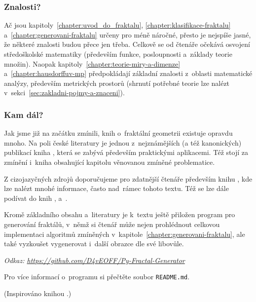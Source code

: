 \subsubsection{Znalosti?}

Ač jsou kapitoly~\ref{chapter:uvod_do_fraktalu}, \ref{chapter:klasifikace-fraktalu} a~\ref{chapter:generovani-fraktalu} určeny pro méně náročné, přesto je nejspíše jasné, že některé znalosti budou přece jen třeba. Celkově se od čtenáře očekává osvojení středoškolské matematiky (především funkce, posloupnosti a~základy teorie množin). Naopak kapitoly~\ref{chapter:teorie-miry-a-dimenze} a~\ref{chapter:hausdorffuv-mp} předpokládají základní znalosti z~oblasti matematické analýzy, především metrických prostorů (shrnutí potřebné teorie lze nalézt v~sekci~\ref{sec:zakladni-pojmy-a-znaceni}).

\subsubsection{Kam dál?}

Jak jsme již na začátku zmínili, knih o~fraktální geometrii existuje opravdu mnoho. Na poli české literatury je jednou z~nejznámějších (a též kanonických) publikací kniha \cite{Zelinka2006}, která se zabývá především praktickými aplikacemi. Též stojí za zmínění i~kniha \cite{Voracova2022} obsahující kapitolu věnovanou zmíněné problematice.

Z cizojazyčných zdrojů doporučujeme pro zdatnější čtenáře především knihu \cite{Falconer1989}, kde lze nalézt mnohé informace, často nad~rámec tohoto textu. Též se lze dále podívat do knih \cite{Prusinkiewicz1990}, \cite{Edgar2008} a~\cite{Mattila1995}.

Kromě základního obsahu a~literatury je k~textu ještě přiložen program pro generování fraktálů, v~němž si čtenář může nejen prohlédnout celkovou implementaci algoritmů zmíněných v~kapitole~\ref{chapter:generovani-fraktalu}, ale také vyzkoušet vygenerovat i~další obrazce dle své libovůle.

\textit{Odkaz: \url{https://github.com/D4vEOFF/Py-Fractal-Generator}}

Pro více informací o~programu si přečtěte soubor \texttt{README.md}.

(Inspirováno knihou \cite{Hladik2019}.)